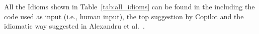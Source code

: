 

All the Idioms shown in Table~\ref{tab:all_idioms} can be found in the \repl{} including the code used as input (i.e., human input), the top suggestion by Copilot and the idiomatic way suggested in Alexandru et al.~\cite{Alexandru2018}.
